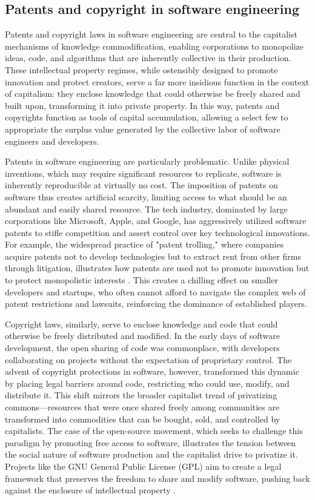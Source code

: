 \begin{refsection}
\subsection{Patents and copyright in software engineering}

Patents and copyright laws in software engineering are central to the capitalist mechanisms of knowledge commodification, enabling corporations to monopolize ideas, code, and algorithms that are inherently collective in their production. These intellectual property regimes, while ostensibly designed to promote innovation and protect creators, serve a far more insidious function in the context of capitalism: they enclose knowledge that could otherwise be freely shared and built upon, transforming it into private property. In this way, patents and copyrights function as tools of capital accumulation, allowing a select few to appropriate the surplus value generated by the collective labor of software engineers and developers.

Patents in software engineering are particularly problematic. Unlike physical inventions, which may require significant resources to replicate, software is inherently reproducible at virtually no cost. The imposition of patents on software thus creates artificial scarcity, limiting access to what should be an abundant and easily shared resource. The tech industry, dominated by large corporations like Microsoft, Apple, and Google, has aggressively utilized software patents to stifle competition and assert control over key technological innovations. For example, the widespread practice of "patent trolling," where companies acquire patents not to develop technologies but to extract rent from other firms through litigation, illustrates how patents are used not to promote innovation but to protect monopolistic interests \cite[pp.~38-40]{bessen2014}. This creates a chilling effect on smaller developers and startups, who often cannot afford to navigate the complex web of patent restrictions and lawsuits, reinforcing the dominance of established players.

Copyright laws, similarly, serve to enclose knowledge and code that could otherwise be freely distributed and modified. In the early days of software development, the open sharing of code was commonplace, with developers collaborating on projects without the expectation of proprietary control. The advent of copyright protections in software, however, transformed this dynamic by placing legal barriers around code, restricting who could use, modify, and distribute it. This shift mirrors the broader capitalist trend of privatizing commons—resources that were once shared freely among communities are transformed into commodities that can be bought, sold, and controlled by capitalists. The case of the open-source movement, which seeks to challenge this paradigm by promoting free access to software, illustrates the tension between the social nature of software production and the capitalist drive to privatize it. Projects like the GNU General Public License (GPL) aim to create a legal framework that preserves the freedom to share and modify software, pushing back against the enclosure of intellectual property \cite[pp.~25-27]{stallman2002}.


\end{refsection}
